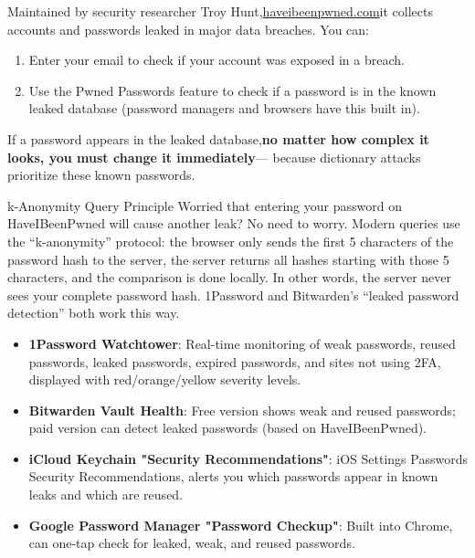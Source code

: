 Maintained by security researcher Troy Hunt,\href{https://haveibeenpwned.com}{haveibeenpwned.com}it collects accounts and passwords leaked in major data breaches. You can:

\begin{enumerate}
  \item Enter your email to check if your account was exposed in a breach.
  \item Use the Pwned Passwords feature to check if a password is in the known leaked database (password managers and browsers have this built in).
\end{enumerate}

If a password appears in the leaked database,\textbf{no matter how complex it looks, you must change it immediately}— because dictionary attacks prioritize these known passwords.

\begin{tcbinfo}{k-Anonymity Query Principle}
Worried that entering your password on HaveIBeenPwned will cause another leak? No need to worry. Modern queries use the “k-anonymity” protocol: the browser only sends the first 5 characters of the password hash to the server, the server returns all hashes starting with those 5 characters, and the comparison is done locally. In other words, the server never sees your complete password hash. 1Password and Bitwarden's “leaked password detection” both work this way.

\end{tcbinfo}


\begin{itemize}
  \item \textbf{1Password Watchtower}: Real-time monitoring of weak passwords, reused passwords, leaked passwords, expired passwords, and sites not using 2FA, displayed with red/orange/yellow severity levels.
  \item \textbf{Bitwarden Vault Health}: Free version shows weak and reused passwords; paid version can detect leaked passwords (based on HaveIBeenPwned).
  \item \textbf{iCloud Keychain "Security Recommendations"}: iOS Settings Passwords Security Recommendations, alerts you which passwords appear in known leaks and which are reused.
  \item \textbf{Google Password Manager "Password Checkup"}: Built into Chrome, can one-tap check for leaked, weak, and reused passwords.
\end{itemize}

